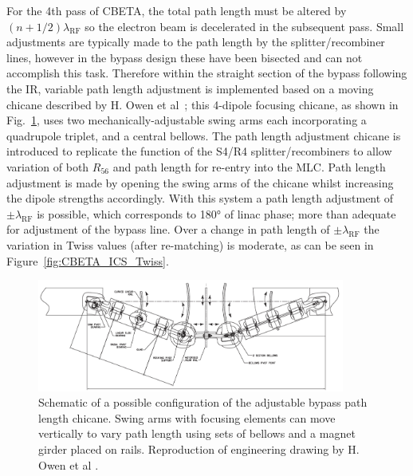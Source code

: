 \documentclass[../main.tex]{subfiles}
\begin{document}
For the 4th pass of CBETA, the total path length must be altered by $(n+1/2)\lambda_{\mathrm{RF}}$ so the electron beam is decelerated in the subsequent pass. Small adjustments are typically made to the path length by the splitter/recombiner lines, however in the bypass design these have been bisected and can not accomplish this task. Therefore within the straight section of the bypass following the IR, variable path length adjustment is implemented based on a moving chicane described by H. Owen et al~\cite{owen2012modular}; this 4-dipole focusing chicane, as shown in Fig.~\ref{fig:bypass_chicane_drawing}, uses two mechanically-adjustable swing arms each incorporating a quadrupole triplet, and a central bellows. The path length adjustment chicane is introduced to replicate the function of the S4/R4 splitter/recombiners to allow variation of both $R_{56}$ and path length for re-entry into the MLC. Path length adjustment is made by opening the swing arms of the chicane whilst increasing the dipole strengths accordingly. With this system a path length adjustment of $\pm\lambda_{\mathrm{RF}}$ is possible, which corresponds to 180\si{\degree} of linac phase; more than adequate for adjustment of the bypass line. Over a change in path length of $\pm\lambda_{\mathrm{RF}}$ the variation in Twiss values (after re-matching) is moderate, as can be seen in Figure~\ref{fig:CBETA_ICS_Twiss}.
\begin{figure}[!h]
\centering
\includegraphics[width=0.9\textwidth]{Figures/CBETA_Inverse_Compton_Source_Design/CBETA_bypass_adjustment_chicane.pdf}
\caption{Schematic of a possible configuration of the adjustable bypass path length chicane. Swing arms with focusing elements can move vertically to vary path length using sets of bellows and a magnet girder placed on rails. Reproduction of engineering drawing by H. Owen et al \cite{owen2012modular}.}
\label{fig:bypass_chicane_drawing}
\end{figure}
\end{document}
